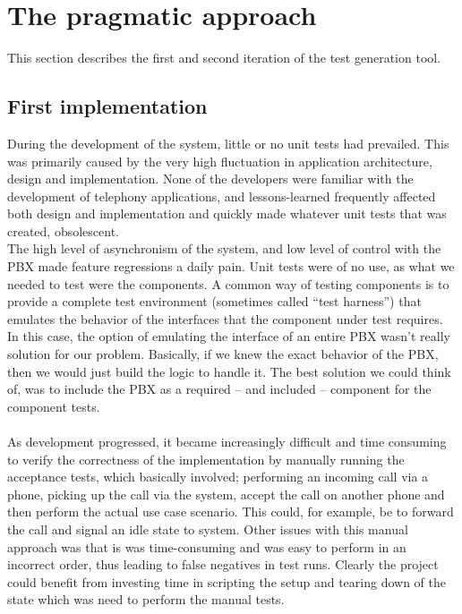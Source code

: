 \chapter{The pragmatic approach}
This section describes the first and second iteration of the test generation tool.
\section{First implementation}
During the development of the system, little or no unit tests had prevailed. This  was primarily caused by the very high fluctuation in application architecture, design and implementation. None of the developers were familiar with the development of telephony applications, and lessons-learned frequently affected both design and implementation and quickly made whatever unit tests that was created, obsolescent.\\
The high level of asynchronism of the system, and low level of control with the PBX made feature regressions a daily pain. Unit tests were of no use, as what we needed to test were the components. A common way of testing components is to provide a complete test environment (sometimes called ``test harness'') that emulates the behavior of the interfaces that the component under test requires. In this case, the option of emulating the interface of an entire PBX wasn't really solution for our problem. Basically, if we knew the exact behavior of the PBX, then we would just build the logic to handle it. The best solution we could think of, was to include the PBX as a required -- and included -- component for the component tests.\\\\
As development progressed, it became increasingly difficult and time consuming to verify the correctness of the implementation by manually running the acceptance tests, which basically involved; performing an incoming call via a phone, picking up the call via the system, accept the call on another phone and then perform the actual use case scenario. This could, for example, be to forward the call and signal an idle state to system. Other issues with this manual approach was that is was time-consuming and was easy to perform in an incorrect order, thus leading to false negatives in test runs. Clearly the project could benefit from investing time in scripting the setup and tearing down of the state which was need to perform the manual tests.\\\\
